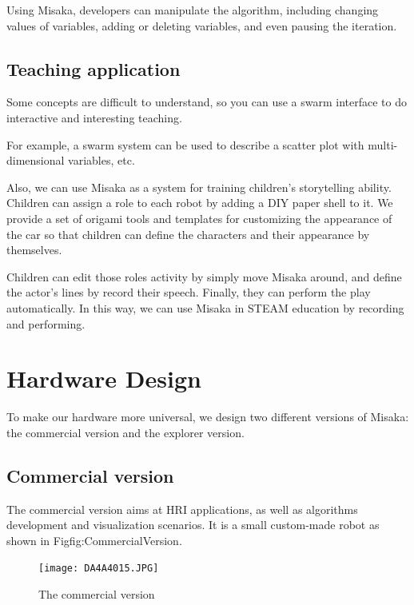 \documentclass[sigconf]{acmart}
\begin{document}
Using Misaka, developers can manipulate the algorithm, including changing values of variables, adding or deleting variables, and even pausing the iteration.

\subsection{Teaching application}

Some concepts are difficult to understand, so you can use a swarm interface to do interactive and interesting teaching.

For example, a swarm system can be used to describe a scatter plot with multi-dimensional variables, etc. 

Also, we can use Misaka as a system for training children's storytelling ability. Children can assign a role to each robot by adding a DIY paper shell to it. We provide a set of origami tools and templates for customizing the appearance of the car so that children can define the characters and their appearance by themselves.

Children can edit those roles activity by simply move Misaka around, and define the actor's lines by record their speech. Finally, they can perform the play automatically. In this way, we can use Misaka in STEAM education by recording and performing.





\section{Hardware Design}

To make our hardware more universal, we design two different versions of Misaka: the commercial version and the explorer version.

\subsection{Commercial version}

The commercial version aims at HRI applications, as well as algorithms development and visualization scenarios. It is a small custom-made robot as shown in Fig{fig:CommercialVersion}.

\begin{figure}[h]
  \centering
  \texttt{[image: DA4A4015.JPG]}
  \caption{The commercial version}
  \label{fig:CommercialVersion}
\end{figure}
\end{document}
